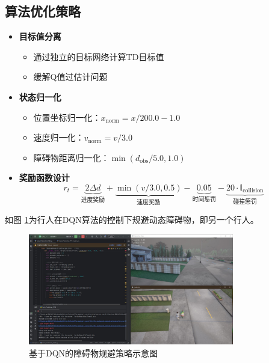 \subsection{算法优化策略}
\begin{itemize}
    \item \textbf{目标值分离}
    \begin{itemize}
        \item 通过独立的目标网络计算TD目标值
        \item 缓解Q值过估计问题
    \end{itemize}
    
    \item \textbf{状态归一化}
    \begin{itemize}
        \item 位置坐标归一化：$x_{\text{norm}} = x/200.0 - 1.0$
        \item 速度归一化：$v_{\text{norm}} = v/3.0$
        \item 障碍物距离归一化：$\min(d_{\text{obs}}/5.0, 1.0)$
    \end{itemize}
    
    \item \textbf{奖励函数设计}
    \[
    r_t = \underbrace{2\Delta d}_{\text{进度奖励}} + \underbrace{\min(v/3.0, 0.5)}_{\text{速度奖励}} - \underbrace{0.05}_{\text{时间惩罚}} - \underbrace{20\cdot\mathbb{I}_{\text{collision}}}_{\text{碰撞惩罚}}
    \]
\end{itemize}

如图 \ref{fig:avoidance}为行人在DQN算法的控制下规避动态障碍物，即另一个行人。

\begin{figure}[H]
    \centering
    \includegraphics[width=0.8\textwidth]{images/pedestrian_avoidance.pdf}
    \caption{基于DQN的障碍物规避策略示意图}
    \label{fig:avoidance}
\end{figure}

